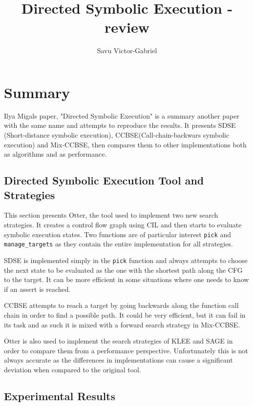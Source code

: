\documentclass{article}
\title{Directed Symbolic Execution - review}
\author{Savu Victor-Gabriel}
\begin{document}
\maketitle

\section{Summary}

Ilya Migals paper, "Directed Symbolic Execution" \cite{revpaper} is a summary another paper with the same name \cite{ma2011directed} and attempts to reproduce the results. It presents SDSE (Short-distance symbolic execution), CCBSE(Call-chain-backwars symbolic execution) and Mix-CCBSE, then compares them to other implementations both as algorithms and as performance.

\subsection{Directed Symbolic Execution Tool and Strategies}

This section presents Otter, the tool used to implement two new search strategies. It creates a control flow graph using CIL and then starts to evaluate symbolic execution states. Two functions are of particular interest \texttt{pick} and \texttt{manage\_targets} as they contain the entire implementation for all strategies.

SDSE is implemented simply in the \texttt{pick} function and always attempts to choose the next state to be evaluated as the one with the shortest path along the CFG to the target. It can be more efficient in some situations where one needs to know if an assert is reached.

CCBSE attempts to reach a target by going backwards along the function call chain in order to find a possible path. It could be very efficient, but it can fail in its task and as such it is mixed with a forward search strategy in Mix-CCBSE.

Otter is also used to implement the search strategies of KLEE and SAGE in order to compare them from a performance perspective. Unfortunately this is not always accurate as the differences in implementations can cause a significant deviation when compared to the original tool.

\subsection{Experimental Results}
\end{document}
